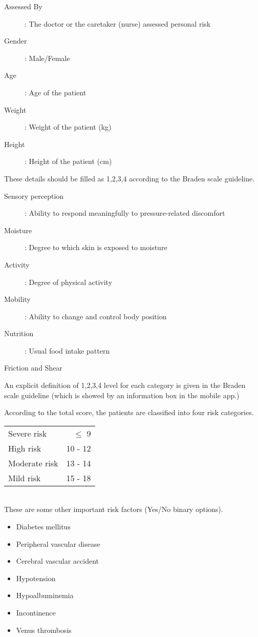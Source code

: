 \begin{description}
	\item[Assessed By]: The doctor or the caretaker (nurse) assessed personal risk
	\item[Gender]: Male/Female
	\item[Age]: Age of the patient
	\item[Weight]: Weight of the patient (kg)
	\item[Height]: Height of the patient (cm)    
\end{description}

These details should be filled as 1,2,3,4 according to the Braden scale guideline. 

\begin{description}
	\item[Sensory perception]: Ability to respond meaningfully to pressure-related discomfort 
	\item[Moisture]: Degree to which skin is exposed to moisture 
	\item[Activity]: Degree of physical	activity 
	\item[Mobility]: Ability to change and control body position
	\item[Nutrition]: Usual food intake 	pattern 
	\item[Friction and Shear]     
\end{description}

An explicit definition of 1,2,3,4 level for each category is given in the Braden scale guideline (which is showed by an information box in the mobile app.)

According to the total score, the patients are classified into four risk categories.


\begin{tabular}{l r}
	Severe risk &  $\leq$ 9\\
	High risk &  10 - 12\\
	Moderate risk & 13 - 14\\
	Mild risk &  15 - 18 \\
\end{tabular}\\

These are some other important risk factors (Yes/No binary options). 

\begin{itemize}
	\item Diabetes mellitus
	\item Peripheral vascular disease
	\item Cerebral vascular accident
	\item Hypotension
	\item Hypoalbuminemia
	\item Incontinence
	\item Venus thrombosis	
\end{itemize}


